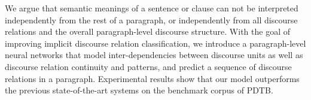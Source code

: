 We argue that semantic meanings of a sentence or clause can not be interpreted independently from the rest of a paragraph, or independently from all discourse relations and the overall paragraph-level discourse structure. With the goal of improving implicit discourse relation classification, we introduce a paragraph-level neural networks that model inter-dependencies between discourse units as well as discourse relation continuity and patterns, and predict a sequence of discourse relations in a paragraph. Experimental results show that our model outperforms the previous state-of-the-art systems on the benchmark corpus of PDTB.

